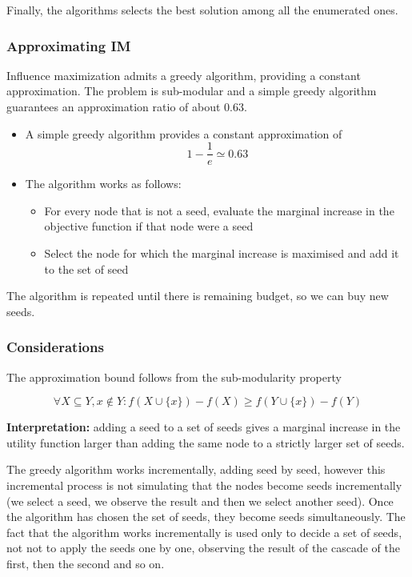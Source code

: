 \documentclass[10pt,a4paper]{article}
\begin{document}
Finally, the algorithms selects the best solution among all the enumerated ones.

\subsubsection{Approximating IM}\label{approximating-im}

Influence maximization admits a greedy algorithm, providing a constant approximation. The problem is sub-modular and a simple greedy algorithm guarantees an approximation ratio of about $0.63$.

\begin{itemize}
\item A simple greedy algorithm provides a constant approximation of
$$1-\frac{1}{e} \simeq 0.63$$
\item The algorithm works as follows:
\begin{itemize}
\item For every node that is not a seed, evaluate the marginal increase in the objective function if that node were a seed
\item Select the node for which the marginal increase is maximised and add it to the set of seed
\end{itemize}
\end{itemize}

The algorithm is repeated until there is remaining budget, so we can buy new seeds.

\subsubsection{Considerations}\label{considerations-1}

The approximation bound follows from the sub-modularity property

$$\forall X \subseteq Y, x \notin Y: f(X \cup \{x\}) - f(X) \ge f(Y \cup \{x\}) - f(Y)$$

\textbf{Interpretation:} adding a seed to a set of seeds gives a marginal increase in the utility function larger than adding the same node to a strictly larger set of seeds.

The greedy algorithm works incrementally, adding seed by seed, however this incremental process is not simulating that the nodes become seeds incrementally (we select a seed, we observe the result and then we select another seed). Once the algorithm has chosen the set of seeds, they become seeds simultaneously. The fact that the algorithm works incrementally is used only to decide a set of seeds, not not to apply the seeds one by one, observing the result of the cascade of the first, then the second and so on.
\end{document}
